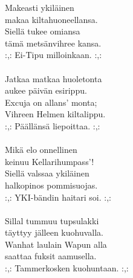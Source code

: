 
            Makeasti ykiläinen \\
            makaa kiltahuoneellansa. \\
            Siellä tukee omiansa \\
            tämä metsänvihree kansa. \\
            :,: Ei-Tipu milloinkaan. :,: \\
\hspace{10mm} \\
            Jatkaa matkaa huoletonta \\
            aukee päivän esirippu. \\
            Excuja on allans’ monta; \\
            Vihreen Helmen kiltalippu. \\
            :,: Päällänsä liepoittaa. :,: \\
\hspace{10mm} \\
            Mikä elo onnellinen \\
            keinuu Kellarihumpass’! \\
            Siellä valssaa ykiläinen \\
            halkopinos pommisuojas. \\
            :,: YKI-bändin haitari soi. :,: \\
\hspace{10mm} \\
            Sillal tummuu tupsulakki \\
            täyttyy jälleen kuohuvalla. \\
            Wanhat laulain Wapun alla \\
            saattaa fuksit aamusella. \\
            :,: Tammerkosken kuohuntaan. :,: \\
